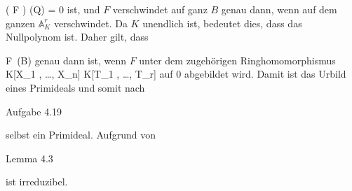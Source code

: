 {\mavergleichskette
{\vergleichskette
{ ( F \circ \varphi  )  (Q)
}
{ = }{ 0
}
{  }{
}
{    }{
}
{   }{
}
}
{}{}{}
ist, und $F$ verschwindet auf ganz $B$ genau dann, wenn
 auf dem ganzen ${ {\mathbb A}_{  K  }^{  r   } }$ verschwindet. Da $K$ unendlich ist, bedeutet dies, dass
 das Nullpolynom ist. Daher gilt, dass

\mavergleichskette
{\vergleichskette
{ F
}
{ \in }{  \,(B)
}
{  }{
}
{    }{
}
{   }{
}
}
{}{}{}
genau dann ist, wenn $F$ unter dem zugehörigen Ringhomomorphismus
\maabbdisp {\tilde{\varphi}} { K[X_1 , \ldots ,  X_n] } { K[T_1 , \ldots , T_r]
} {}
auf $0$ abgebildet wird. Damit ist
 das Urbild eines Primideals
 {} {}
und somit nach

Aufgabe 4.19

selbst ein Primideal. Aufgrund von

Lemma 4.3

ist
 irreduzibel.




}
